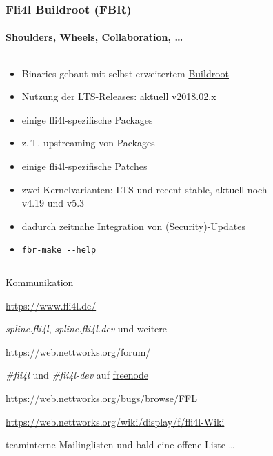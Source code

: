 \documentclass[t]{beamer}
\newcommand{\dashdash}[1]{-\hspace{0pt}-#1}
\begin{document}
\begin{frame}
    \frametitle{Fli4l Buildroot (FBR)}
    \framesubtitle{Shoulders, Wheels, Collaboration, …}
    \begin{columns}[T,onlytextwidth]
        \begin{column}{0.65\textwidth}
            \begin{itemize}
                \item Binaries gebaut mit selbst erweitertem \href{https://buildroot.org/}{Buildroot}
                \item Nutzung der LTS-Releases: aktuell v2018.02.x
                \item einige fli4l-spezifische Packages
                \item z.\,T. upstreaming von Packages
                \item einige fli4l-spezifische Patches
                \item zwei Kernelvarianten: LTS und recent stable, aktuell noch v4.19 und v5.3
                \item dadurch zeitnahe Integration von (Security)-Updates
                \item \texttt{fbr-make \dashdash{help}}
            \end{itemize}
        \end{column}
        \begin{column}{0.35\textwidth}
            \begin{figure}
            \end{figure}
        \end{column}
    \end{columns}
\end{frame}

\begin{frame}{Kommunikation}
    \begin{description}[Newsgroups]
        \item[WWW] \url{https://www.fli4l.de/}
        \item[Newsgroups] \emph{spline.fli4l}, \emph{spline.fli4l.dev}
            und weitere
        \item[Forum] \url{https://web.nettworks.org/forum/}
        \item[IRC] \emph{\#fli4l} und \emph{\#fli4l-dev} auf
            \href{https://freenode.net/}{freenode}
        \item[Bugtracker] \url{https://web.nettworks.org/bugs/browse/FFL}
        \item[Wiki] \small
            \url{https://web.nettworks.org/wiki/display/f/fli4l-Wiki}
            \normalsize
        \item[E-Mail] teaminterne Mailinglisten und bald eine offene Liste …
    \end{description}
\end{frame}
\end{document}
